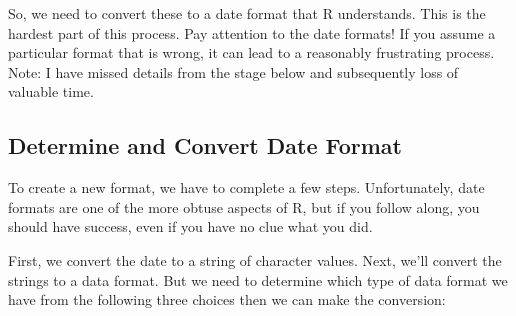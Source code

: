 \documentclass{article}\usepackage[]{graphicx}\usepackage[]{color}
\begin{document}
So, we need to convert these to a date format that R understands. This is the hardest part of this process. Pay attention to the date formats!  If you assume a particular format that is wrong, it can lead to a reasonably frustrating process. Note: I have missed details from the stage below and subsequently loss of valuable time. 

\subsection{Determine and Convert Date Format}

To create a new format, we have to complete a few steps. Unfortunately, date formats are one of the more obtuse aspects of R, but if you follow along, you should have success, even if you have no clue what you did. 

First, we convert the date to a string of character values. Next, we'll convert the strings to a data format. But we need to determine which type of data format we have from the following three choices then we can make the conversion:
\end{document}
